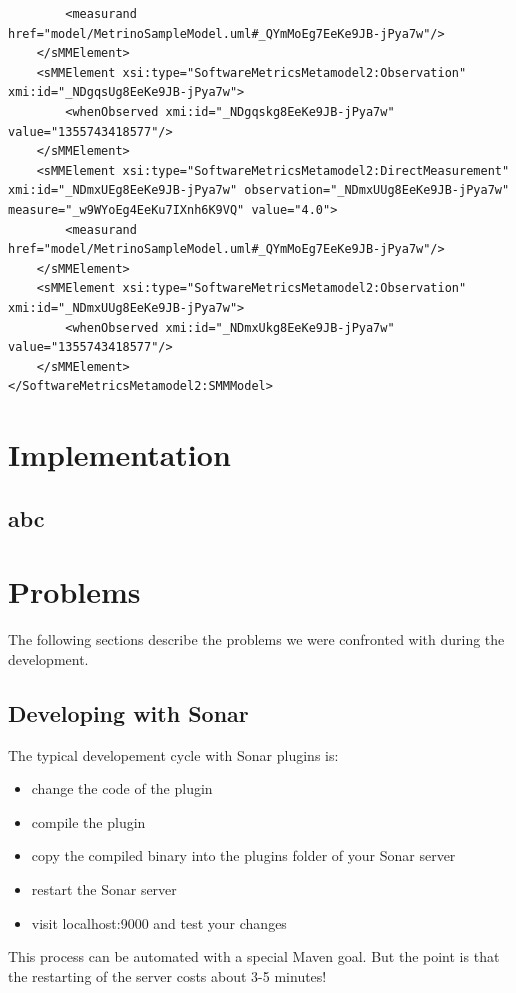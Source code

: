 \begin{verbatim}
        <measurand href="model/MetrinoSampleModel.uml#_QYmMoEg7EeKe9JB-jPya7w"/>
    </sMMElement>
    <sMMElement xsi:type="SoftwareMetricsMetamodel2:Observation" xmi:id="_NDgqsUg8EeKe9JB-jPya7w">
        <whenObserved xmi:id="_NDgqskg8EeKe9JB-jPya7w" value="1355743418577"/>
    </sMMElement>
    <sMMElement xsi:type="SoftwareMetricsMetamodel2:DirectMeasurement" xmi:id="_NDmxUEg8EeKe9JB-jPya7w" observation="_NDmxUUg8EeKe9JB-jPya7w" measure="_w9WYoEg4EeKu7IXnh6K9VQ" value="4.0">
        <measurand href="model/MetrinoSampleModel.uml#_QYmMoEg7EeKe9JB-jPya7w"/>
    </sMMElement>
    <sMMElement xsi:type="SoftwareMetricsMetamodel2:Observation" xmi:id="_NDmxUUg8EeKe9JB-jPya7w">
        <whenObserved xmi:id="_NDmxUkg8EeKe9JB-jPya7w" value="1355743418577"/>
    </sMMElement>
</SoftwareMetricsMetamodel2:SMMModel>
\end{verbatim}


\section{Implementation}
\subsection{abc}










\section{Problems}

The following sections describe the problems we were confronted with during the development.

\subsection{Developing with Sonar}
The typical developement cycle with Sonar plugins is:
\begin{itemize}
	\item change the code of the plugin
	\item compile the plugin
	\item copy the compiled binary into the plugins folder of your Sonar server
	\item restart the Sonar server
	\item visit localhost:9000 and test your changes
\end{itemize}
This process can be automated with a special Maven goal. But the point is that the restarting of the server costs about 3-5 minutes!

